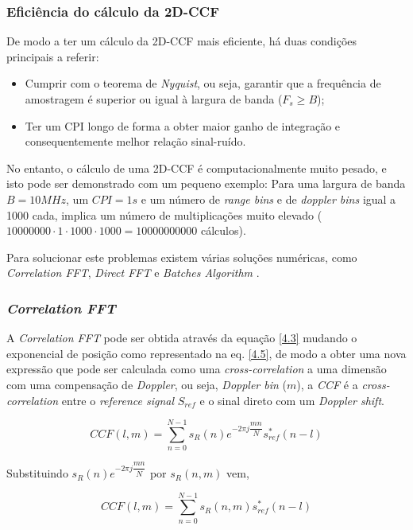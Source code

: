 \subsubsection*{Eficiência do cálculo da \gls{2D-CCF}}
De modo a ter um cálculo da \gls{2D-CCF} mais eficiente, há duas condições principais a referir:
\begin{itemize}
\item Cumprir com o teorema de \textit{Nyquist}, ou seja, garantir que a frequência de amostragem é superior ou igual à largura de banda ($F_{s}\geq B$); 
\item Ter um \gls{CPI} longo de forma a obter maior ganho de integração e consequentemente melhor relação sinal-ruído.
\end{itemize}
\par
No entanto, o cálculo de uma \gls{2D-CCF} é computacionalmente muito pesado, e isto pode ser demonstrado com um pequeno exemplo: Para uma largura de banda $B=10MHz$, um $CPI=1s$ e um número de \textit{range bins} e de \textit{doppler bins} igual a 1000 cada, implica um número de multiplicações muito elevado ($10000000\cdot 1\cdot 1000\cdot 1000=10000000000$ cálculos).\par
Para solucionar este problemas existem várias soluções numéricas, como \textit{Correlation FFT}, \textit{Direct FFT} e \textit{Batches Algorithm} \parencite{Martorella}.

\subsubsection*{\textit{Correlation FFT}}
A \textit{Correlation FFT} pode ser obtida através da equação \ref{4.3} mudando o exponencial de posição como representado na eq. \ref{4.5}, de modo a obter uma nova expressão que pode ser calculada como uma \textit{cross-correlation} a uma dimensão com uma compensação de \textit{Doppler}, ou seja, \textit{Doppler bin} ($m$), a \textit{\gls{CCF}} é a \textit{cross-correlation} entre o \textit{reference signal} $S_{ref}$ e o sinal direto com um \textit{Doppler shift}.

\begin{equation} \label{4.5}
CCF\left(l,m\right) =\sum_{n=0}^{N-1} s_{R}\left( n\right)e^{-2\pi j\dfrac{mn}{N}}s_{ref}^{\ast}\left(n -l\right)
\end{equation}

Substituindo $s_{R}\left( n\right)e^{-2\pi j\dfrac{mn}{N}}$ por $s_{R}(n,m)$ vem,

\begin{equation} \label{4.6}
CCF\left(l,m\right) =\sum_{n=0}^{N-1} s_{R}\left( n,m\right) s_{ref}^{\ast}\left(n -l\right)
\end{equation}

